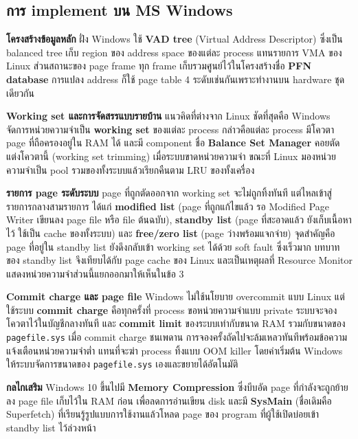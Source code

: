 \documentclass[a4paper,11pt]{article}
\newcommand{\code}[1]{\texttt{#1}}
\begin{document}
\subsection{การ implement บน MS Windows}

\textbf{โครงสร้างข้อมูลหลัก} ฝั่ง Windows ใช้ \textbf{VAD tree} (Virtual Address Descriptor) ซึ่งเป็น balanced tree เก็บ region ของ address space ของแต่ละ process แทนรายการ VMA ของ Linux ส่วนสถานะของ page frame ทุก frame เก็บรวมศูนย์ไว้ในโครงสร้างชื่อ \textbf{PFN database} การแปลง address ก็ใช้ page table 4 ระดับเช่นกันเพราะทำงานบน hardware ชุดเดียวกัน

\textbf{Working set และการจัดสรรแบบรายบ้าน} แนวคิดที่ต่างจาก Linux ชัดที่สุดคือ Windows จัดการหน่วยความจำเป็น \textbf{working set} ของแต่ละ process กล่าวคือแต่ละ process มีโควตา page ที่ถือครองอยู่ใน RAM ได้ และมี component ชื่อ \textbf{Balance Set Manager} คอยตัดแต่งโควตานี้ (working set trimming) เมื่อระบบขาดหน่วยความจำ ขณะที่ Linux มองหน่วยความจำเป็น pool รวมของทั้งระบบแล้วเรียกคืนตาม LRU ของทั้งเครื่อง

\textbf{รายการ page ระดับระบบ} page ที่ถูกตัดออกจาก working set จะไม่ถูกทิ้งทันที แต่ไหลเข้าสู่รายการกลางสามรายการ ได้แก่ \textbf{modified list} (page ที่ถูกแก้ไขแล้ว รอ Modified Page Writer เขียนลง page file หรือ file ต้นฉบับ), \textbf{standby list} (page ที่สะอาดแล้ว ยังเก็บเนื้อหาไว้ ใช้เป็น cache ของทั้งระบบ) และ \textbf{free/zero list} (page ว่างพร้อมแจกจ่าย) จุดสำคัญคือ page ที่อยู่ใน standby list ยังดึงกลับเข้า working set ได้ด้วย soft fault ซึ่งเร็วมาก บทบาทของ standby list จึงเทียบได้กับ page cache ของ Linux และเป็นเหตุผลที่ Resource Monitor แสดงหน่วยความจำส่วนนี้แยกออกมาให้เห็นในข้อ 3

\textbf{Commit charge และ page file} Windows ไม่ใช้นโยบาย overcommit แบบ Linux แต่ใช้ระบบ \textbf{commit charge} คือทุกครั้งที่ process ขอหน่วยความจำแบบ private ระบบจะจองโควตาไว้ในบัญชีกลางทันที และ \textbf{commit limit} ของระบบเท่ากับขนาด RAM รวมกับขนาดของ \code{pagefile.sys} เมื่อ commit charge ชนเพดาน การจองครั้งถัดไปจะล้มเหลวทันทีพร้อมข้อความแจ้งเตือนหน่วยความจำต่ำ แทนที่จะฆ่า process ทิ้งแบบ OOM killer โดยค่าเริ่มต้น Windows ให้ระบบจัดการขนาดของ \code{pagefile.sys} เองและขยายได้อัตโนมัติ

\textbf{กลไกเสริม} Windows 10 ขึ้นไปมี \textbf{Memory Compression} ซึ่งบีบอัด page ที่กำลังจะถูกย้ายลง page file เก็บไว้ใน RAM ก่อน เพื่อลดการอ่านเขียน disk และมี \textbf{SysMain} (ชื่อเดิมคือ Superfetch) ที่เรียนรู้รูปแบบการใช้งานแล้วโหลด page ของ program ที่ผู้ใช้เปิดบ่อยเข้า standby list ไว้ล่วงหน้า
\end{document}
